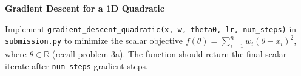 \item {} \textbf{Gradient Descent for a 1D Quadratic}

Implement \texttt{gradient\_descent\_quadratic(x, w, theta0, lr, num\_steps)} in \texttt{submission.py} to minimize the scalar objective
$f(\theta) = \sum_{i=1}^n w_i (\theta - x_i)^2$, where $\theta\in\mathbb{R}$ (recall problem 3a).
The function should return the final scalar iterate after \texttt{num\_steps} gradient steps.

